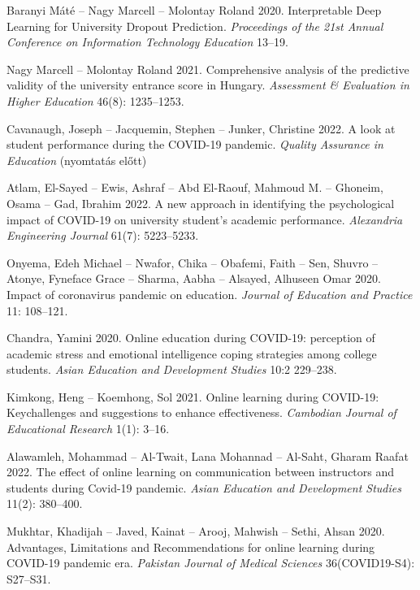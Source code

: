 \documentclass[12pt]{article}
\begin{document}
\begin{thebibliography}{9}
Baranyi Máté -- Nagy Marcell -- Molontay Roland 2020. Interpretable Deep Learning for University Dropout Prediction. \textit{Proceedings of the 21st Annual Conference on Information Technology Education} 13--19. 

Nagy Marcell -- Molontay Roland 2021. Comprehensive analysis of the predictive validity of the university entrance score in Hungary. \textit{Assessment \& Evaluation in Higher Education} 46(8): 1235--1253.

Cavanaugh, Joseph -- Jacquemin, Stephen -- Junker, Christine 2022. A look at student performance during the COVID-19 pandemic. \textit{Quality Assurance in Education} (nyomtatás előtt)

Atlam, El-Sayed -- Ewis, Ashraf -- Abd El-Raouf, Mahmoud M. --  Ghoneim, Osama -- Gad, Ibrahim 2022. A new approach in identifying the psychological impact of COVID-19 on university student’s academic performance. \textit{Alexandria Engineering Journal} 61(7): 5223--5233. 

Onyema, Edeh Michael -- Nwafor, Chika -- Obafemi, Faith -- Sen, Shuvro -- Atonye, Fyneface Grace -- Sharma, Aabha -- Alsayed, Alhuseen Omar 2020. Impact of coronavirus pandemic on education. \textit{Journal of Education and Practice} 11: 108--121. 

Chandra, Yamini 2020. Online education during COVID-19: perception of academic stress and emotional intelligence coping strategies among college students. \textit{Asian Education and Development Studies} 10:2 229--238. 

Kimkong, Heng -- Koemhong, Sol 2021. Online learning during COVID-19: Keychallenges and suggestions to enhance effectiveness. \textit{Cambodian Journal of Educational Research} 1(1): 3--16. 

Alawamleh, Mohammad -- Al-Twait, Lana Mohannad -- Al-Saht, Gharam Raafat 2022. The effect of online learning on communication between instructors and students during Covid-19 pandemic. \textit{Asian Education and Development Studies} 11(2): 380--400.

Mukhtar, Khadijah -- Javed, Kainat -- Arooj, Mahwish -- Sethi, Ahsan 2020. Advantages, Limitations and Recommendations for online learning during COVID-19 pandemic era. \textit{Pakistan Journal of Medical Sciences} 36(COVID19-S4): S27--S31.  


\end{thebibliography}
\end{document}
